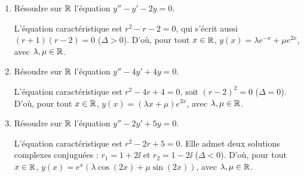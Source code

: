 \documentclass[class=report,crop=false]{standalone}
\begin{document}
\begin{exemple}
\sauteligne
\begin{enumerate}
  \item Résoudre sur $\mathbb{R}$ l'équation $y'' - y' - 2y = 0$.

L'équation caractéristique est $r^2 - r - 2 = 0$,  qui s'écrit aussi $(r+1)(r-2) = 0$ ($\Delta >0$).
D'où, pour tout $x \in \mathbb{R}$, $y(x) = \lambda e^{-x} + \mu e^{2x}$,
avec $\lambda,\mu \in \mathbb{R}$.

  \item Résoudre sur $\mathbb{R}$ l'équation $y'' - 4y' + 4y = 0$.

L'équation caractéristique est $r^2 - 4r + 4 = 0$,
soit $(r-2)^2 = 0$ ($\Delta=0$). D'où, pour tout $x \in \mathbb{R}$,
$y(x) = (\lambda x + \mu) e^{2x}$, avec $\lambda,\mu \in \mathbb{R}$.

  \item Résoudre sur $\mathbb{R}$ l'équation $y'' - 2y' + 5y = 0$.

L'équation caractéristique est $r^2-2r+5 = 0$.
Elle admet deux solutions complexes conjuguées :
$r_1 = 1 + 2\ii$ et $r_2 = 1 - 2\ii$ ($\Delta<0$).
D'où, pour tout $x \in \mathbb{R}$,
$y(x) = e^x (\lambda \cos(2x) + \mu \sin(2x))$, avec $\lambda, \mu \in \mathbb{R}$.
\end{enumerate}
\end{exemple}
\end{document}

